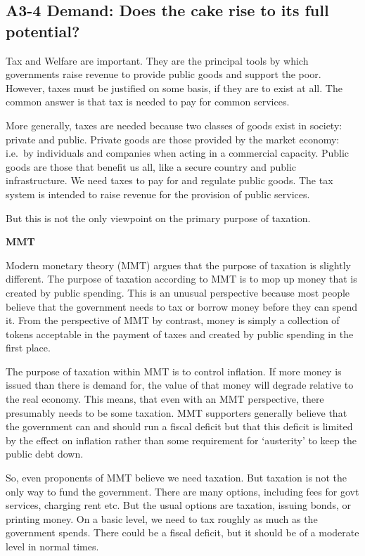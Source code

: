 \documentclass[]{tufte-handout}
\begin{document}
\hypertarget{a3-4-demand-does-the-cake-rise-to-its-full-potential}{%
\subsection{A3-4 Demand: Does the cake rise to its full
potential?}\label{a3-4-demand-does-the-cake-rise-to-its-full-potential}}

Tax and Welfare are important. They are the principal tools by which
governments raise revenue to provide public goods and support the poor.
However, taxes must be justified on some basis, if they are to exist at
all. The common answer is that tax is needed to pay for common services.

More generally, taxes are needed because two classes of goods exist in
society: private and public. Private goods are those provided by the
market economy: i.e.~by individuals and companies when acting in a
commercial capacity. Public goods are those that benefit us all, like a
secure country and public infrastructure. We need taxes to pay for and
regulate public goods. The tax system is intended to raise revenue for
the provision of public services.

But this is not the only viewpoint on the primary purpose of taxation.

\textbf{MMT}

Modern monetary theory (MMT) argues that the purpose of taxation is
slightly different. The purpose of taxation according to MMT is to mop
up money that is created by public spending. This is an unusual
perspective because most people believe that the government needs to tax
or borrow money before they can spend it. From the perspective of MMT by
contrast, money is simply a collection of tokens acceptable in the
payment of taxes and created by public spending in the first place.

The purpose of taxation within MMT is to control inflation. If more
money is issued than there is demand for, the value of that money will
degrade relative to the real economy. This means, that even with an MMT
perspective, there presumably needs to be some taxation. MMT supporters
generally believe that the government can and should run a fiscal
deficit but that this deficit is limited by the effect on inflation
rather than some requirement for `austerity' to keep the public debt
down.

So, even proponents of MMT believe we need taxation. But taxation is not
the only way to fund the government. There are many options, including
fees for govt services, charging rent etc. But the usual options are
taxation, issuing bonds, or printing money. On a basic level, we need to
tax roughly as much as the government spends. There could be a fiscal
deficit, but it should be of a moderate level in normal times.
\end{document}
